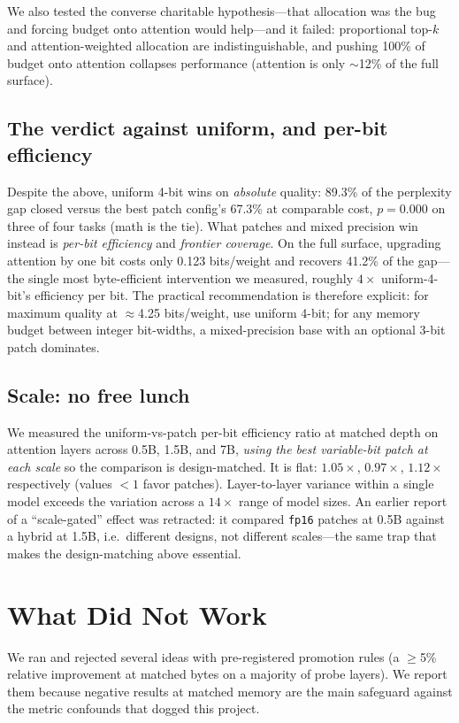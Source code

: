 \documentclass[11pt]{article}
\newcommand{\bpw}{bits/weight}
\newcommand{\code}[1]{\texttt{#1}}
\begin{document}
We also tested the converse charitable hypothesis---that allocation was the
bug and forcing budget onto attention would help---and it failed: proportional
top-$k$ and attention-weighted allocation are indistinguishable, and pushing
100\% of budget onto attention collapses performance (attention is only
$\sim$12\% of the full surface).

\subsection{The verdict against uniform, and per-bit efficiency}
Despite the above, uniform 4-bit wins on \emph{absolute} quality: 89.3\% of the
perplexity gap closed versus the best patch config's 67.3\% at comparable cost,
$p{=}0.000$ on three of four tasks (math is the tie). What patches and mixed
precision win instead is \emph{per-bit efficiency} and \emph{frontier
coverage}. On the full surface, upgrading attention by one bit costs only
0.123 \bpw{} and recovers 41.2\% of the gap---the single most byte-efficient
intervention we measured, roughly $4\times$ uniform-4-bit's efficiency per
bit. The practical recommendation is therefore explicit: for maximum quality
at $\approx$4.25 \bpw{}, use uniform 4-bit; for any memory budget between
integer bit-widths, a mixed-precision base with an optional 3-bit patch
dominates.

\subsection{Scale: no free lunch}
\label{sec:scale}
We measured the uniform-vs-patch per-bit efficiency ratio at matched depth on
attention layers across 0.5B, 1.5B, and 7B, \emph{using the best variable-bit
patch at each scale} so the comparison is design-matched. It is flat:
$1.05\times$, $0.97\times$, $1.12\times$ respectively (values $<1$ favor
patches). Layer-to-layer variance within a single model exceeds the variation
across a $14\times$ range of model sizes. An earlier report of a
``scale-gated'' effect was retracted: it compared \code{fp16} patches at 0.5B
against a hybrid at 1.5B, i.e.\ different designs, not different scales---the
same trap that makes the design-matching above essential.

\section{What Did Not Work}
\label{sec:negative}
We ran and rejected several ideas with pre-registered promotion rules
(a $\geq$5\% relative improvement at matched bytes on a majority of probe
layers). We report them because negative results at matched memory are the
main safeguard against the metric confounds that dogged this project.
\end{document}
